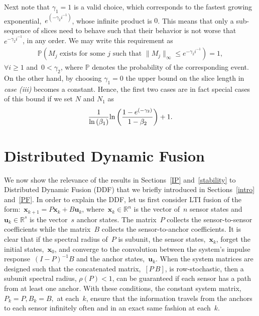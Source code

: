 \documentclass[draftclsnofoot, onecolumn, 12pt]{IEEEtran}
\def\ln{{\rm ln}}
\def\mb{\mathbf}
\def\mbb{\mathbb}
\begin{document}
Next note that $\gamma_1=1$ is a valid choice, which corresponds to the fastest growing exponential,~$e^{(-\gamma_2 i^{-1})}$, whose infinite product is $0$. 
This means that only a sub-sequence of slices need to behave such that their behavior is not worse that~${e^{-\gamma_2i^{-1}}}$, in any order. We may write this requirement as 
\begin{eqnarray*}
\mbb{P}\left(M_j \mbox{ exists for some~$j$ such that }\|M_j\|_\infty\leq {e^{-\gamma_2i^{-1}}}\right)=1,
\end{eqnarray*}
$\forall i\geq1$ and~$0<\gamma_2$, where $\mbb{P}$ denotes the probability of the corresponding event. On the other hand, by choosing $\gamma_1=0$ the upper bound on the slice length in \textit{case (iii)} becomes a constant. Hence, the first two cases are in fact special cases of this bound if we set $N$ and $N_1$ as
\begin{eqnarray*}
\frac{1}{\ln\left({\beta_1}\right)}\ln\left(\frac{1 - e^{(-\gamma_2)}}{1-\beta_2}\right)+1.
\end{eqnarray*}


\section{Distributed Dynamic Fusion}\label{app}
We now show the relevance of the results in Sections~\ref{IP} and~\ref{stability} to Distributed Dynamic Fusion (DDF) that we briefly introduced in Sections~\ref{intro} and~\ref{PF}. In order to explain the DDF, let us first consider LTI fusion of the form:~$\mb{x}_{k+1} = P\mb{x}_k+B\mb{u}_k$, where~$\mb{x}_k\in\mbb{R}^n$ is the vector of~$n$ sensor states and~$\mb{u}_k\in\mbb{R}^s$ is the vector~$s$ anchor states. The matrix~$P$ collects the sensor-to-sensor coefficients while the matrix~$B$ collects the sensor-to-anchor coefficients. It is clear that if the spectral radius of~$P$ is subunit, the sensor states,~$\mb{x}_k$, forget the initial states,~$\mb{x}_0$, and converge to the convolution between the system's impulse response~$(I-P)^{-1}B$ and the anchor states,~$\mb{u}_k$. When the system matrices are designed such that the concatenated matrix,~$[P~B]$, is row-stochastic, then a subunit spectral radius, $\rho(P)<1$, can be guaranteed if each sensor has a path from at least one anchor. With these conditions, the constant system matrix, $P_k=P,B_k=B,$ at each~$k$, ensure that the information travels from the anchors to each sensor infinitely often and in an exact same fashion at each~$k$. 
\end{document}
